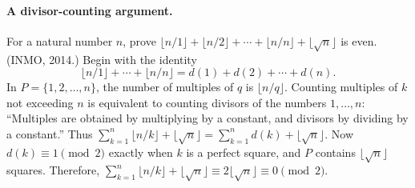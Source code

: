 \documentclass[11pt,a4paper]{article}
\begin{document}

\paragraph{A divisor-counting argument.}
For a natural number $n$, prove
$\lfloor n/1\rfloor+\lfloor n/2\rfloor+\cdots+\lfloor n/n\rfloor+\lfloor\sqrt n\rfloor$ is even.
(INMO, 2014.)
Begin with the identity
\[
\lfloor n/1\rfloor+\cdots+\lfloor n/n\rfloor
=d(1)+d(2)+\cdots+d(n).
\]
In $P=\{1,2,\ldots,n\}$, the number of multiples of $q$ is $\lfloor n/q\rfloor$.
Counting multiples of $k$ not exceeding $n$ is equivalent to counting divisors of the numbers $1,\ldots,n$:
``Multiples are obtained by multiplying by a constant, and divisors by dividing by a constant.''
Thus $\sum_{k=1}^n\lfloor n/k\rfloor+\lfloor\sqrt n\rfloor
=\sum_{k=1}^n d(k)+\lfloor\sqrt n\rfloor$.
Now $d(k)\equiv1\pmod2$ exactly when $k$ is a perfect square, and $P$ contains $\lfloor\sqrt n\rfloor$ squares.
Therefore,
$\sum_{k=1}^n\lfloor n/k\rfloor+\lfloor\sqrt n\rfloor
\equiv2\lfloor\sqrt n\rfloor\equiv0\pmod2$.

\end{document}
